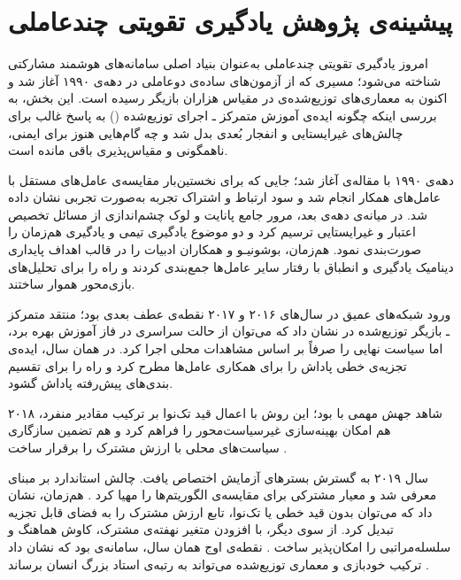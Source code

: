 \section{پیشینه‌ی پژوهش یادگیری تقویتی چندعاملی}\label{sec:marl_lit}

امروز یادگیری تقویتی چندعاملی به‌عنوان بنیاد اصلی سامانه‌های هوشمند مشارکتی شناخته می‌شود؛ مسیری که از آزمون‌های ساده‌ی دو‌عاملی در دهه‌ی ۱۹۹۰ آغاز شد و اکنون به معماری‌های توزیع‌شده‌ی در مقیاس هزاران بازیگر رسیده است. این بخش، به بررسی اینکه چگونه ایده‌ی {آموزش متمرکز ـ اجرای توزیع‌شده} () به پاسخ غالب برای چالش‌های غیرایستایی و انفجار بُعدی
 بدل شد و چه گام‌هایی هنوز برای ایمنی، ناهمگونی و مقیاس‌پذیری باقی مانده است.

دهه‌ی ۱۹۹۰ با مقاله‌ی \cite{Tan1993} آغاز شد؛ جایی که برای نخستین‌بار مقایسه‌ی عامل‌های مستقل با عامل‌های همکار انجام شد و سود ارتباط و اشتراک تجربه به‌صورت تجربی نشان داده شد. در میانه‌ی دهه‌ی بعد، مرور جامع پانایت و لوک \cite{Panait2005} چشم‌اندازی از مسائل تخصیص اعتبار و غیرایستایی ترسیم کرد و دو موضوع یادگیری تیمی و یادگیری هم‌زمان را صورت‌بندی نمود.  هم‌زمان، بوشونیـو و همکاران \cite{Busoniu2008} ادبیات  را در قالب اهداف پایداری دینامیک یادگیری و انطباق با رفتار سایر عامل‌ها جمع‌بندی کردند و راه را برای تحلیل‌های بازی‌محور هموار ساختند. 

ورود شبکه‌های عمیق در سال‌های ۲۰۱۶ و ۲۰۱۷ نقطه‌ی عطف بعدی بود؛ منتقد متمرکز ـ بازیگر توزیع‌شده در  \cite{Lowe2017} نشان داد که می‌توان از حالت سراسری در فاز آموزش بهره برد، اما سیاست نهایی را صرفاً بر اساس مشاهدات محلی اجرا کرد.  در همان سال، 
\cite{Sunehag2017} ایده‌ی تجزیه‌ی خطی پاداش را برای همکاری عامل‌ها مطرح کرد و راه را برای تقسیم بندی‌های پیش‌رفته پاداش گشود. 

۲۰۱۸ شاهد جهش مهمی با  بود؛ این روش با اعمال قید تک‌نوا
 بر ترکیب مقادیر منفرد، هم امکان بهینه‌سازی غیرسیاست‌محور را فراهم کرد و هم تضمین سازگاری سیاست‌های محلی با ارزش مشترک را برقرار ساخت \cite{Rashid2018}. 

سال ۲۰۱۹ به گسترش بسترهای آزمایش اختصاص یافت. چالش استاندارد
  بر مبنای  معرفی شد و معیار مشترکی برای مقایسه‌ی الگوریتم‌ها را مهیا کرد
  \cite{Samvelyan2019SMAC}.
  هم‌زمان،  \cite{Son2019QTRAN} نشان داد که می‌توان بدون قید خطی یا تک‌نوا، تابع ارزش مشترک را به فضای قابل تجزیه تبدیل کرد. از سوی دیگر،  با افزودن متغیر نهفته‌ی مشترک، کاوش هماهنگ و سلسله‌مراتبی را امکان‌پذیر ساخت \cite{Mahajan2019MAVEN}.  نقطه‌ی اوج همان سال، سامانه‌ی  بود که نشان داد ترکیب خودبازی و معماری توزیع‌شده می‌تواند به رتبه‌ی استاد بزرگ
   انسان برساند \cite{Vinyals2019AlphaStar}. 

